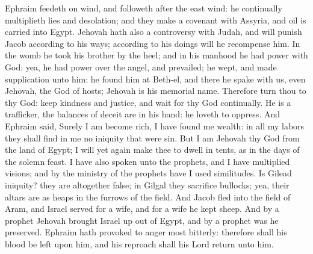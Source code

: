 Ephraim feedeth on wind, and followeth after the east wind: he continually multiplieth lies and desolation; and they make a covenant with Assyria, and oil is carried into Egypt. Jehovah hath also a controversy with Judah, and will punish Jacob according to his ways; according to his doings will he recompense him. In the womb he took his brother by the heel; and in his manhood he had power with God: yea, he had power over the angel, and prevailed; he wept, and made supplication unto him: he found him at Beth-el, and there he spake with us, even Jehovah, the God of hosts; Jehovah is his memorial name. Therefore turn thou to thy God: keep kindness and justice, and wait for thy God continually.  He is a trafficker, the balances of deceit are in his hand: he loveth to oppress. And Ephraim said, Surely I am become rich, I have found me wealth: in all my labors they shall find in me no iniquity that were sin. But I am Jehovah thy God from the land of Egypt; I will yet again make thee to dwell in tents, as in the days of the solemn feast. I have also spoken unto the prophets, and I have multiplied visions; and by the ministry of the prophets have I used similitudes. Is Gilead iniquity? they are altogether false; in Gilgal they sacrifice bullocks; yea, their altars are as heaps in the furrows of the field. And Jacob fled into the field of Aram, and Israel served for a wife, and for a wife he kept sheep. And by a prophet Jehovah brought Israel up out of Egypt, and by a prophet was he preserved. Ephraim hath provoked to anger most bitterly: therefore shall his blood be left upon him, and his reproach shall his Lord return unto him. 


